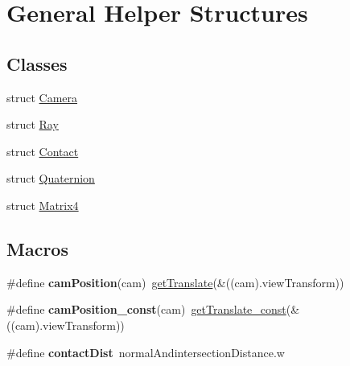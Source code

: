 \hypertarget{group__g12}{}\section{General Helper Structures}
\label{group__g12}
\subsection*{Classes}
\begin{DoxyCompactItemize}
\item 
struct \hyperlink{struct_camera}{Camera}
\item 
struct \hyperlink{struct_ray}{Ray}
\item 
struct \hyperlink{struct_contact}{Contact}
\item 
struct \hyperlink{struct_quaternion}{Quaternion}
\item 
struct \hyperlink{struct_matrix4}{Matrix4}
\end{DoxyCompactItemize}
\subsection*{Macros}
\begin{DoxyCompactItemize}
\item 
\#define {\bfseries cam\+Position}(cam)~\hyperlink{group__g12_gaf7c337bbc999d8405021f3aaf6b98906}{get\+Translate}(\&((cam).view\+Transform))\hypertarget{group__g12_ga315f815a8472fbf5f5cd38996b3fbe27}{}\label{group__g12_ga315f815a8472fbf5f5cd38996b3fbe27}

\item 
\#define {\bfseries cam\+Position\+\_\+const}(cam)~\hyperlink{group__g12_ga5d10bde3877494a1a9bc98ecd48f8748}{get\+Translate\+\_\+const}(\&((cam).view\+Transform))\hypertarget{group__g12_ga0adfc0a1c4b17f235372e3195a715d7b}{}\label{group__g12_ga0adfc0a1c4b17f235372e3195a715d7b}

\item 
\#define {\bfseries contact\+Dist}~normal\+Andintersection\+Distance.\+w\hypertarget{group__g12_ga199cfc5b9dce36c17bf8386b86d8f9ea}{}\label{group__g12_ga199cfc5b9dce36c17bf8386b86d8f9ea}

\end{DoxyCompactItemize}
